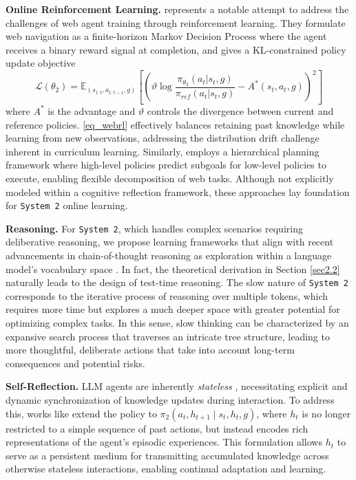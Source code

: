 \documentclass{article}
\begin{document}
\textbf{Online Reinforcement Learning.} \citet{qi2025webrltrainingllmweb} represents a notable attempt to address the challenges of web agent training through reinforcement learning. They formulate web navigation as a finite-horizon Markov Decision Process where the agent receives a binary reward signal at completion, and gives a KL-constrained policy update objective 
\begin{equation}
    \mathcal{L}(\theta_2) = \mathbb{E}_{(s_{1:t},a_{1:t-1},g)}\left[\left(\vartheta \log \frac{\pi_{\theta_2}(a_t|s_t, g)}{\pi_{ref}(a_t|s_t, g)} - A^*(s_t, a_t, g)\right)^2\right]
    \label{eq_webrl}
\end{equation}
where $A^*$ is the advantage and $\vartheta$ controls the divergence between current and reference policies. \eqref{eq_webrl} effectively balances retaining past knowledge while learning from new observations, addressing the distribution drift challenge inherent in curriculum learning. Similarly, \citet{prasad2024adaptasneededdecompositionplanning} employs a hierarchical planning framework where high-level policies predict subgoals for low-level policies to execute, enabling flexible decomposition of web tasks. Although not explicitly modeled within a cognitive reflection framework, these approaches lay foundation for \texttt{System 2} online learning.

\textbf{Reasoning.}\label{reasoning} For \texttt{System 2}, which handles complex scenarios requiring deliberative reasoning, we propose learning frameworks that align with recent advancements in chain-of-thought reasoning as exploration within a language model's vocabulary space \citep{yao2023tree, hao2023reasoning, shao2024deepseekmath, qin2024o1}. In fact, the theoretical derivation in Section \ref{sec2.2} naturally leads to the design of test-time reasoning. The slow nature of \texttt{System 2} corresponds to the iterative process of reasoning over multiple tokens, which requires more time but explores a much deeper space with greater potential for optimizing complex tasks. In this sense, slow thinking can be characterized by an expansive search process that traverses an intricate tree structure, leading to more thoughtful, deliberate actions that take into account long-term consequences and potential risks.

\textbf{Self-Reflection.} LLM agents are inherently \textit{stateless} \citep{sumers2023cognitive}, necessitating explicit and dynamic synchronization of knowledge updates during interaction. To address this, works like \citet{shinn2023reflexionlanguageagentsverbal} extend the policy to $\pi_2(a_t, h_{t+1} \mid s_t, h_t, g)$, where $h_t$ is no longer restricted to a simple sequence of past actions, but instead encodes rich representations of the agent's episodic experiences. This formulation allows $h_t$ to serve as a persistent medium for transmitting accumulated knowledge across otherwise stateless interactions, enabling continual adaptation and learning.
\end{document}
